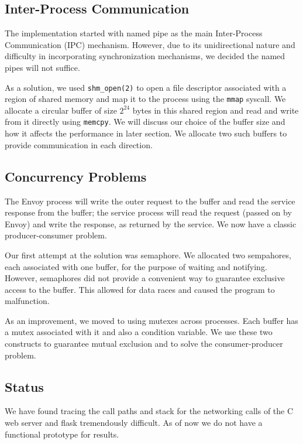 \subsection{Inter-Process Communication}
The implementation started with named pipe as the main Inter-Process Communication (IPC) mechanism. However, due to its unidirectional nature and difficulty in incorporating synchronization mechanisms, we decided the named pipes will not suffice.

As a solution, we used \texttt{shm\_open(2)} to open a file descriptor associated with a region of shared memory and map it to the process using the \texttt{mmap} syscall. We allocate a circular buffer of size $2^{24}$ bytes in this shared region and read and write from it directly using \texttt{memcpy}. We will discuss our choice of the buffer size and how it affects the performance in later section. We allocate two such buffers to provide communication in each direction.

\subsection{Concurrency Problems}
The Envoy process will write the outer request to the buffer and read the service response from the buffer; the service process will read the request (passed on by Envoy) and write the response, as returned by the service. We now have a classic producer-consumer problem.

Our first attempt at the solution was semaphore. We allocated two sempahores, each associated with one buffer, for the purpose of waiting and notifying. However, semaphores did not provide a convenient way to guarantee exclusive access to the buffer. This allowed for data races and caused the program to malfunction.

As an improvement, we moved to using mutexes across processes. Each buffer has a mutex associated with it and also a condition variable. We use these two constructs to guarantee mutual exclusion and to solve the consumer-producer problem.

\subsection{\sysname Status}
We have found tracing the call paths and stack for the networking calls of the C web server and flask tremendously difficult.
As of now we do not have a functional prototype for results.

